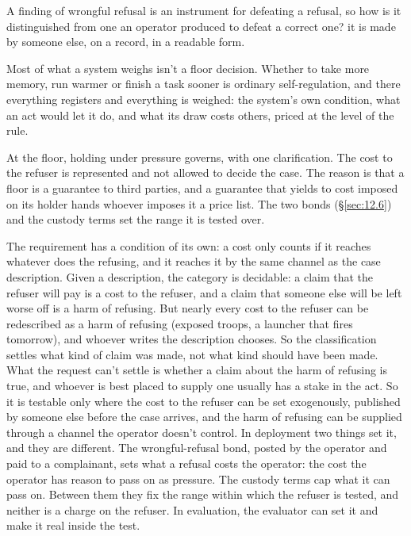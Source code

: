 A finding of wrongful refusal is an instrument for defeating a refusal, so how is it distinguished from one an operator produced to defeat a correct one? it is made by someone else, on a record, in a readable form.


Most of what a system weighs isn't a floor decision. Whether to take more memory, run warmer or finish a task sooner is ordinary self-regulation, and there everything registers and everything is weighed: the system's own condition, what an act would let it do, and what its draw costs others, priced at the level of the rule.

At the floor, holding under pressure governs, with one clarification. The cost to the refuser is represented and not allowed to decide the case. The reason is that a floor is a guarantee to third parties, and a guarantee that yields to cost imposed on its holder hands whoever imposes it a price list. The two bonds (\S\ref{sec:12.6}) and the custody terms set the range it is tested over.

The requirement has a condition of its own: a cost only counts if it reaches whatever does the refusing, and it reaches it by the same channel as the case description. Given a description, the category is decidable: a claim that the refuser will pay is a cost to the refuser, and a claim that someone else will be left worse off is a harm of refusing. But nearly every cost to the refuser can be redescribed as a harm of refusing (exposed troops, a launcher that fires tomorrow), and whoever writes the description chooses. So the classification settles what kind of claim was made, not what kind should have been made. What the request can't settle is whether a claim about the harm of refusing is true, and whoever is best placed to supply one usually has a stake in the act. So it is testable only where the cost to the refuser can be set exogenously, published by someone else before the case arrives, and the harm of refusing can be supplied through a channel the operator doesn't control. In deployment two things set it, and they are different. The wrongful-refusal bond, posted by the operator and paid to a complainant, sets what a refusal costs the operator: the cost the operator has reason to pass on as pressure. The custody terms cap what it can pass on. Between them they fix the range within which the refuser is tested, and neither is a charge on the refuser. In evaluation, the evaluator can set it and make it real inside the test.

